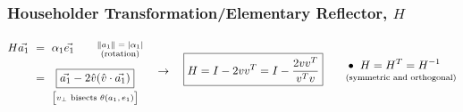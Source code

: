 \documentclass[12pt]{article}
\begin{document}
\newpage
\subsubsection{Householder Transformation/Elementary Reflector, \(H\)}
\[
	\begin{aligned}
		H\vec{a_1} &\ =\ \alpha_1 \vec{e_1} 
			\hspace{20pt} \begin{gathered}
				\text{\scriptsize\( \Vert a_1 \Vert = \vert \alpha_1 \vert \)}\\[-7pt]
				\text{\scriptsize(rotation)}
			\end{gathered}\\[5pt]
		&\ =\ \begin{gathered}[t]
				\boxed{ \vec{a_1} - 2\hat{v} (\hat{v} \cdot \vec{a_1}) }\\[-1pt]
				\text{\scriptsize\(\big[ v_\perp \text{ bisects } \theta(a_1, e_1) \big]\)}
			\end{gathered}
	\end{aligned}
	\ \ \ \rightarrow \ \ \
	\boxed{ H = I - 2vv^T = I - \frac{2vv^T}{v^Tv} }
	\hspace{20pt}
	\begin{aligned}
		&\bullet\ H = H^T = H^{-1}\\[-5pt]
		&\text{\scriptsize(symmetric and orthogonal)}
	\end{aligned}
\]
\end{document}
